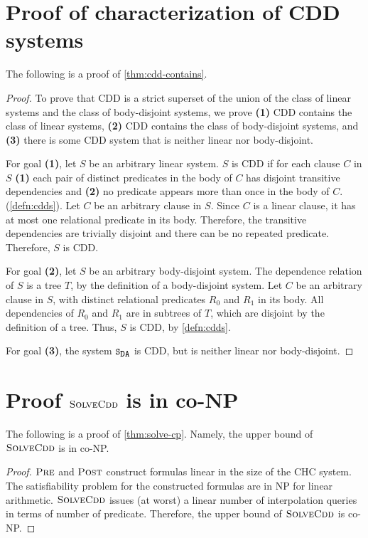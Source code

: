 \section{Proof of characterization of CDD systems}
\label{app:char}
The following is a proof of \autoref{thm:cdd-contains}.
%
\begin{proof}
  To prove that CDD is a strict superset of the union of the class
  of linear systems and the class of body-disjoint systems, we prove
  \textbf{(1)} CDD contains the class of linear systems,
  \textbf{(2)} CDD contains the class of body-disjoint systems, and
  \textbf{(3)} there is some CDD system that is neither linear nor
  body-disjoint.

  For goal \textbf{(1)}, let $S$ be an arbitrary linear
  system.
  $S$ is CDD if for each clause $C$ in
  $S$ \textbf{(1)} each pair of distinct predicates in
  the body of $C$ has disjoint transitive dependencies and
  \textbf{(2)} no predicate appears more than once in the body of $C$.
  (\autoref{defn:cdds}).
  Let $C$ be an arbitrary clause in $S$.
  Since $C$ is a linear clause, it has at most one relational
  predicate in its body. Therefore, the transitive dependencies are
  trivially disjoint and there can be no repeated predicate.
  Therefore, $S$ is CDD.

  For goal \textbf{(2)}, let $S$ be an arbitrary
  body-disjoint system.
  The dependence relation of $S$ is a tree $T$, by the
  definition of a body-disjoint system.
  Let $C$ be an arbitrary clause in $S$, with
  distinct relational predicates $R_0$ and $R_1$ in its body.
  All dependencies of $R_0$ and $R_1$ are in subtrees of $T$, which
  are disjoint by the definition of a tree.
  Thus, $S$ is CDD, by \autoref{defn:cdds}.

  For goal \textbf{(3)}, the system $\mcchc$ is CDD, but is neither linear
  nor body-disjoint.
\end{proof}

\section{Proof $\textsc{SolveCdd}$ is in co-NP}
\label{app:solve-cp}
The following is a proof of \autoref{thm:solve-cp}.
%
Namely, the upper bound of $\textsc{SolveCdd}$ is in co-NP.
%
\begin{proof}
  $\textsc{Pre}$ and $\textsc{Post}$ construct formulas linear in the size of the
  CHC system. The satisfiability problem for the constructed formulas
  are in NP for linear arithmetic.
  $\textsc{SolveCdd}$ issues (at worst) a linear number of interpolation
  queries in terms of number of predicate.
  Therefore, the upper bound of $\textsc{SolveCdd}$ is co-NP.
\end{proof}

